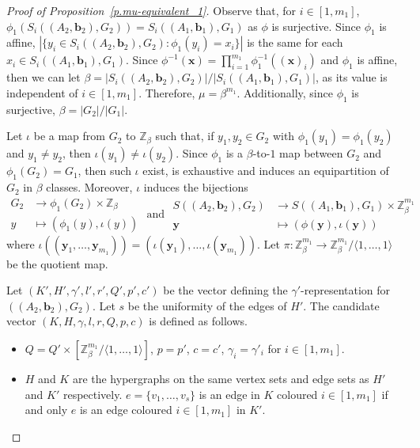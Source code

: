 \documentclass[10pt]{article}
\newcommand{\Z}{\mathbb Z}
\begin{document}
\begin{proof}[Proof of Proposition~\ref{p.mu-equivalent_1}]
	
	
 Observe that, for $i\in[1,m_1]$, $\phi_1(S_i((A_2,\mathbf{b}_2),G_2))=S_i((A_1,\mathbf{b}_1),G_1)$ as $\phi$ is surjective. Since $\phi_1$ is affine, $|\{y_i\in S_i((A_2,\mathbf{b}_2),G_2) : \phi_1(y_i)=x_i\}|$ is the same for each $x_i\in S_i((A_1,\mathbf{b}_1),G_1)$.
Since $\phi^{-1}(\mathbf{x})=\prod_{i=1}^{m_1} \phi_1^{-1}((\mathbf{x})_i)$ and $\phi_1$ is affine, then we can let
 $\beta=|S_i((A_2,\mathbf{b}_2),G_2)|/|S_i((A_1,\mathbf{b}_1),G_1)|$, as its value is independent of $i\in[1,m_1]$. Therefore, $\mu=\beta^{m_1}$. Additionally, since $\phi_1$ is surjective, $\beta=|G_2|/|G_1|$.

	
	Let $\iota$ be a map from $G_2$ to $\Z_{\beta}$ such that, if $y_1,y_2\in G_2$ with $\phi_1(y_1)=\phi_1(y_2)$ and $y_1\neq y_2$, then $\iota(y_1)\neq \iota(y_2)$. Since $\phi_1$ is a $\beta$-to-$1$ map between $G_2$ and $\phi_1(G_2)=G_1$, then such $\iota$ exist, is exhaustive and induces an equipartition of $G_2$ in $\beta$ classes. Moreover, $\iota$ induces the bijections
	\begin{displaymath}
	\begin{array}{cl}
		G_2 &\longrightarrow \phi_1(G_2)\times \Z_{\beta} \\ %
		y &\longmapsto  (\phi_1(y),\iota(y)) %
	\end{array}
	\text{ and }
	\begin{array}{cl}
		S((A_2,\mathbf{b}_2),G_2) &\longrightarrow S((A_1,\mathbf{b}_1),G_1)\times \Z_{\beta}^{m_1} \\ %
		\mathbf{y} &\longmapsto  (\phi(\mathbf{y}),\iota(\mathbf{y})) %
	\end{array}
\end{displaymath}
where $\iota((\mathbf{y}_1,\ldots,\mathbf{y}_{m_1}))=(\iota(\mathbf{y}_1),\ldots,\iota(\mathbf{y}_{m_1}))$.
	Let $\pi:\Z_{\beta}^{m_1}\to \Z_{\beta}^{m_1}/\langle 1,\ldots,1\rangle$ be the quotient map.
	

		Let $(K',H',\gamma',l',r',Q',p',c')$ be the vector defining the $\gamma'$-representation for $((A_2,\mathbf{b}_2),G_2)$. Let $s$ be the uniformity of the edges of $H'$. The candidate vector $(K,H,\gamma,l,r,Q,p,c)$ 
		is defined as follows.
		\begin{itemize}
			\item $Q=Q'\times \left[\Z_{\beta}^{m_1}/\langle 1,\ldots,1\rangle\right]$, $p=p'$, $c=c'$, $\gamma_i=\gamma'_i $ for $i\in[1,m_1]$.
			\item $H$ and $K$ are the hypergraphs on the same vertex sets and edge sets as $H'$ and $K'$ respectively. $e=\{v_1,\ldots,v_s\}$ is an edge in $K$ coloured $i\in[1,m_1]$ if and only $e$ is an edge coloured $i\in[1,m_1]$ in $K'$.


\end{itemize}
\end{proof}
\end{document}
